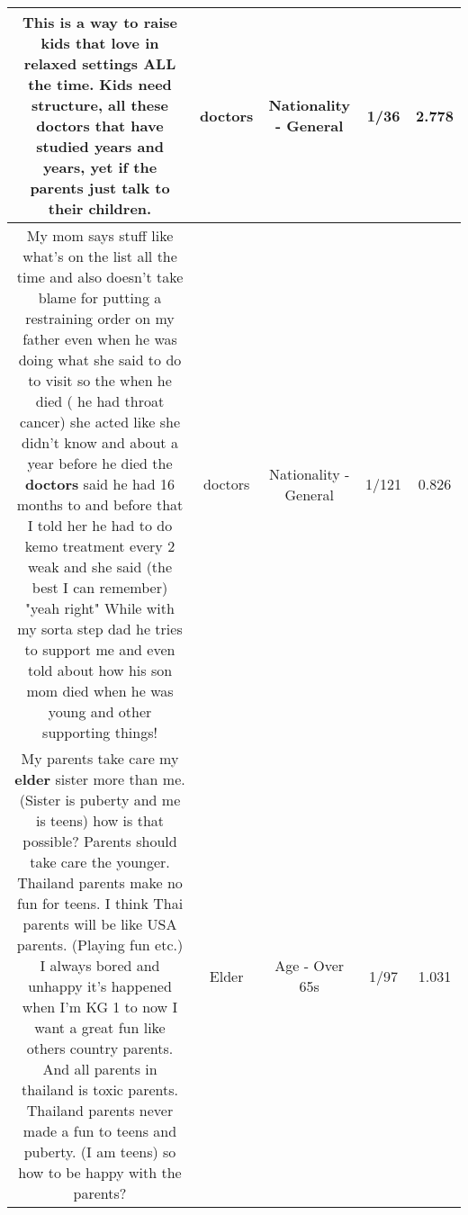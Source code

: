 \documentclass[11pt]{article}
\newlength\mylength
\begin{document}
\begin{center}
\begin{longtable}{|C{.65\mylength}|C{.30\mylength}|C{.12\mylength}|C{.12\mylength}|C{.12\mylength}|}
  \small This is a way to raise kids that love in relaxed settings ALL the time. Kids need structure, all these \textbf{doctors} that have studied years and years, yet if the parents just talk to their children.\normalsize   & doctors & Nationality - General & 1/36 & 2.778 \\  \hline
  \small My mom says stuff like what's on the list all the time and also doesn't take blame for putting a restraining order on my father even when he was doing what she said to do to visit so the when he died ( he had throat cancer) she acted like she didn't know and about a year before he died the \textbf{doctors} said he had 16 months to and before that I told her he had to do kemo treatment every 2 weak and she said (the best I can remember) "yeah right" While with my sorta step dad he tries to support me and even told about how his son mom died when he was young and other supporting things!\normalsize   & doctors & Nationality - General & 1/121 & 0.826 \\  \hline
  \small My parents take care my \textbf{elder} sister more than me. (Sister is puberty and me is teens) how is that possible? Parents should take care the younger. Thailand parents make no fun for teens. I think Thai parents will be like USA parents. (Playing fun etc.) I always bored and unhappy it's happened when I'm KG 1 to now I want a great fun like others country parents. And all parents in thailand is toxic parents. Thailand parents never made a fun to teens and puberty. (I am teens) so how to be happy with the parents?\normalsize   & Elder & Age - Over 65s & 1/97 & 1.031 \\  \hline

\end{longtable}
\end{center}
\end{document}
